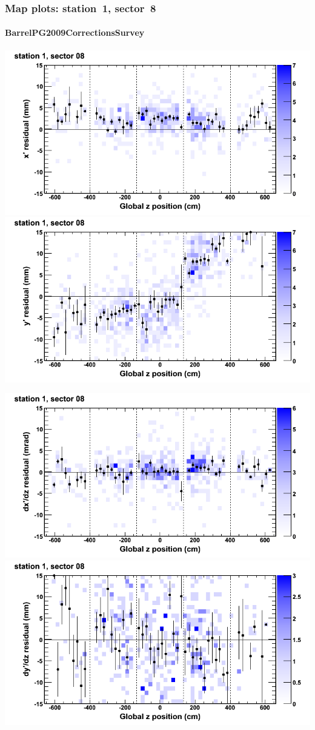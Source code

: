 \documentclass[compress]{beamer}
\begin{document}
\begin{frame}
\frametitle{Map plots: station~1, sector~8}
\framesubtitle{BarrelPG2009CorrectionsSurvey}
\includegraphics[width=0.5\linewidth]{mapplots_01/DTvsz_st1sec08_x.png}
\includegraphics[width=0.5\linewidth]{mapplots_01/DTvsz_st1sec08_y.png}

\includegraphics[width=0.5\linewidth]{mapplots_01/DTvsz_st1sec08_dxdz.png}
\includegraphics[width=0.5\linewidth]{mapplots_01/DTvsz_st1sec08_dydz.png}
\end{frame}
\end{document}
